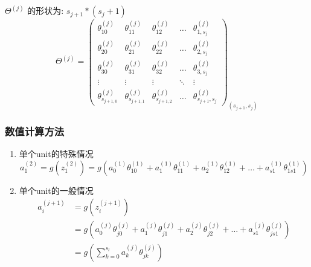$\Theta^{(j)}$ 的形状为: $s_{j+1}*(s_j+1)$ \\

\begin{equation}
\Theta^{(j)} = 
	\left(\begin{matrix}
		\theta_{10}^{(j)} & \theta_{11}^{(j)} & \theta_{12}^{(j)} & \dots & \theta_{1,s_j}^{(j)} \\
		\theta_{20}^{(j)} & \theta_{21}^{(j)} & \theta_{22}^{(j)} & \dots & \theta_{2,s_j}^{(j)} \\
		\theta_{30}^{(j)} & \theta_{31}^{(j)} & \theta_{32}^{(j)} & \dots & \theta_{3,s_j}^{(j)} \\
		\vdots    & \vdots    & \vdots    & \ddots & \vdots   \\
		\theta_{s_{j+1,0}}^{(j)} & \theta_{s_{j+1,1}}^{(j)} & \theta_{s_{j+1,2}}^{(j)} & \dots & \theta_{s_{j+1},s_j}^{(j)}
	\end{matrix}\right)_{(s_{j+1},s_j)}
\end{equation}






\subsubsection{数值计算方法}
\begin{enumerate}
\item 单个unit的特殊情况
\begin{equation}
	a_1^{(2)} = g(z_1^{(2)}) = g(a_0^{(1)}\theta_{10}^{(1)}
	+ a_1^{(1)}\theta_{11}^{(1)}
	+ a_2^{(1)}\theta_{12}^{(1)}
	+ \dots
	+ a_{s1}^{(1)}\theta_{1s1}^{(1)})
\end{equation}

\item 单个unit的一般情况
\begin{equation} \begin{aligned}
	a_i^{(j+1)} &= g(z_i^{(j+1)})
	\\ & = g(a_0^{(j)}\theta_{j0}^{(j)} + a_{1}^{(j)}\theta_{j1}^{(j)} + a_2^{(j)}\theta_{j2}^{(j)} + \dots + a_{s1}^{(j)}\theta_{js1}^{(j)})
	\\ &= g(\sum_{k=0}^{s_l}{a_k^{(j)}\theta_{jk}^{(j)}})
\end{aligned}\end{equation}
\end{enumerate}

